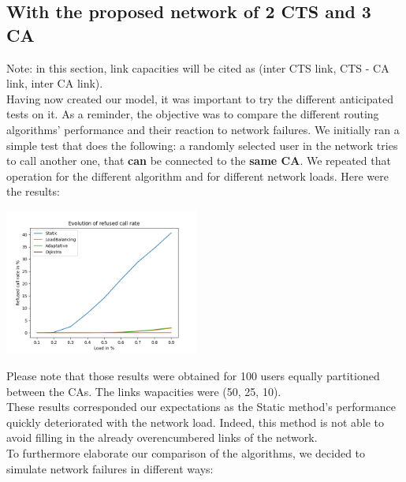 \documentclass[lettersize,journal]{IEEEtran} %
\begin{document}
\subsection{With the proposed network of 2 CTS and 3 CA}
Note: in this section, link capacities will be cited as (inter CTS link, CTS - CA link, inter CA link).\\
Having now created our model, it was important to try the different anticipated tests on it. As a reminder, the objective was to
compare the different routing algorithms' performance and their reaction to network failures.
We initially ran a simple test that does the following: a randomly selected user in the network tries to call another one, that
\textbf{can} be connected to the \textbf{same CA}. We repeated that operation for the different algorithm and for different
network loads. Here were the results:
\begin{center}
\includegraphics[width=0.48\textwidth]{call_rate.png}
\end{center}
Please note that those results were obtained for 100 users equally partitioned between the CAs. The
links wapacities were (50, 25, 10).\\
These results corresponded our expectations as the Static method's performance quickly deteriorated with the network load. Indeed, 
this method is not able to avoid filling in the already overencumbered links of the network.\\
To furthermore elaborate our comparison of the algorithms, we decided to simulate network failures in different ways:
\end{document}
